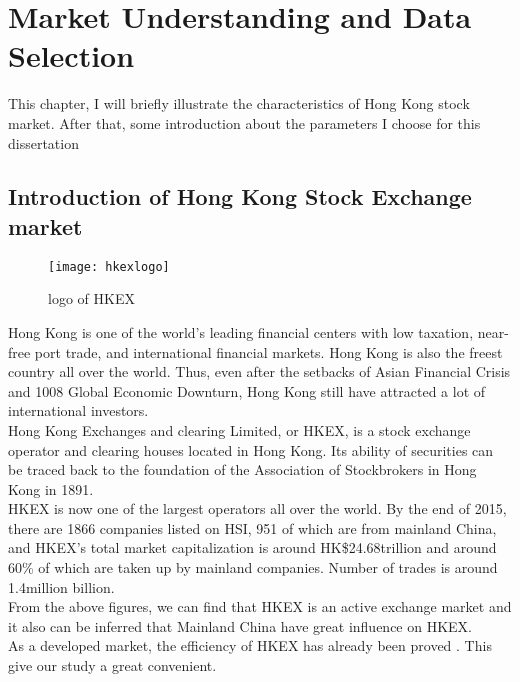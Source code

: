 \chapter{Market Understanding and Data Selection}

This chapter, I will briefly illustrate the characteristics of Hong Kong stock market. After that, some introduction about the parameters I choose for this dissertation

\section{Introduction of Hong Kong Stock Exchange market}

\begin{figure}[h]
	\centering
	\texttt{[image: hkexlogo]}
	\caption{logo of HKEX}
\end{figure}

Hong Kong is one of the world’s leading financial centers with low taxation, near-free port trade, and international financial markets. Hong Kong is also the freest country all over the world\cite{freedom_ranking_2016}. Thus, even after the setbacks of Asian Financial Crisis and 1008 Global Economic Downturn, Hong Kong still have attracted a lot of international investors.\\

Hong Kong Exchanges and clearing Limited, or HKEX, is a stock exchange operator and clearing houses located in Hong Kong. Its ability of securities can be traced back to the foundation of the Association of Stockbrokers in Hong Kong in 1891\cite{1_history_hkex_markets_2016}.\\

HKEX is now one of the largest operators all over the world. By the end of 2015, there are 1866 companies listed on HSI, 951 of which are from mainland China, and HKEX’s total market capitalization is around HK\$24.68trillion and around 60\% of which are taken up by mainland companies. Number of trades is around 1.4million billion\cite{hkex_fact_book_2015}.\\

From the above figures, we can find that HKEX is an active exchange market and it also can be inferred that Mainland China have great influence on HKEX.\\

As a developed market, the efficiency of HKEX has already been proved \cite{su2015efficiency}. This give our study a great convenient.

